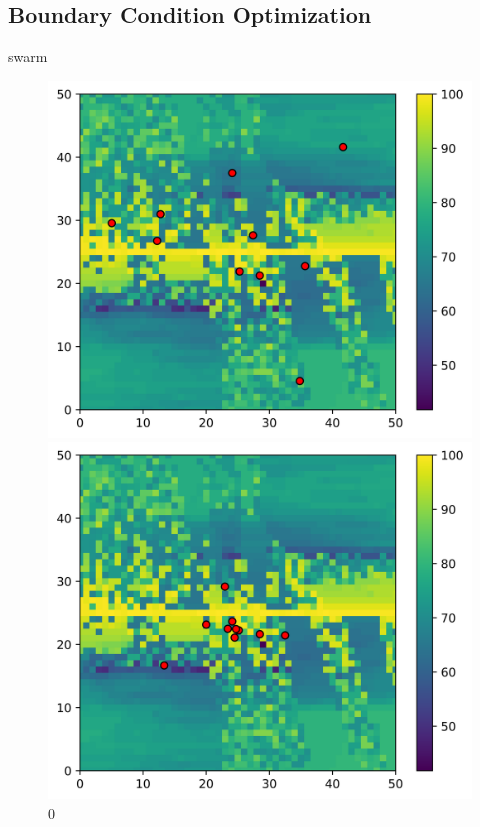 \subsection{Boundary Condition Optimization }
swarm
\begin{figure}[H]
	\centering
	\begin{minipage}{0.5\textwidth}
		\includegraphics[width=\textwidth]{figures/swarm/0.png}
		\caption{0}
		\label{0}
	\end{minipage}\hfill
	\begin{minipage}{0.5\textwidth}
		\includegraphics[width=\textwidth]{figures/swarm/2.png}

\end{minipage}
\end{figure}
